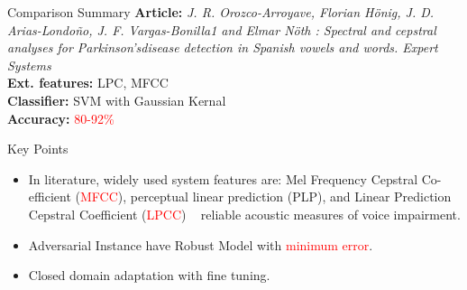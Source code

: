 \documentclass{beamer}
\begin{document}
\begin{frame}{Comparison Summary}
\small \textbf{Article:} \textit{J. R. Orozco-Arroyave, Florian Hönig, J. D. Arias-Londoño, J. F. Vargas-Bonilla1 and Elmar Nöth : Spectral and cepstral analyses for Parkinson’sdisease detection in Spanish vowels and words. Expert Systems}
\\\small\textbf{Ext. features:} LPC, MFCC
\\\small\textbf{Classifier:} SVM with Gaussian Kernal 
\\\small\textbf{Accuracy:} \textcolor{red}{80-92\%}
\end{frame}
\begin{frame}{Key Points}
\begin{itemize}
    \item  In literature, widely used system features are: Mel Frequency Cepstral Co-efficient (\textcolor{red}{MFCC}), perceptual linear prediction (PLP), and Linear Prediction Cepstral Coefficient (\textcolor{red}{LPCC}) ~ reliable acoustic measures of voice impairment.
    \item Adversarial Instance have Robust Model with \textcolor{red}{minimum error}.
    \item Closed domain adaptation with fine tuning. 
\end{itemize}
\end{frame}
\end{document}
